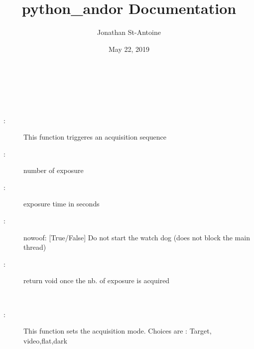 \documentclass[letterpaper,10pt,english]{sphinxmanual}
\title{python\_andor Documentation}
\date{May 22, 2019}
\author{Jonathan St-Antoine}
\begin{document}
\maketitle
\sphinxtableofcontents
{}\label{\detokenize{index::doc}}


\begin{fulllineitems}
\label{\detokenize{index:python_andor.command}}~

\begin{fulllineitems}
\label{\detokenize{index:python_andor.command.acq}}~\begin{description}
\item[{:}] \leavevmode
This function triggeres an acquisition sequence

\item[{: }] \leavevmode
number of exposure

\item[{: }] \leavevmode
exposure time in seconds

\item[{:}] \leavevmode
\textendash{}nowoof\textendash{}: {[}True/False{]} Do not start the watch dog (does not block the main thread)

\item[{:}] \leavevmode
return void once the nb. of exposure is acquired

\end{description}

\end{fulllineitems}


\begin{fulllineitems}
\label{\detokenize{index:python_andor.command.acq_mode}}~\begin{description}
\item[{:}] \leavevmode
This function sets the acquisition mode. Choices are : Target, video,flat,dark


\end{description}
\end{fulllineitems}
\end{fulllineitems}
\end{document}
